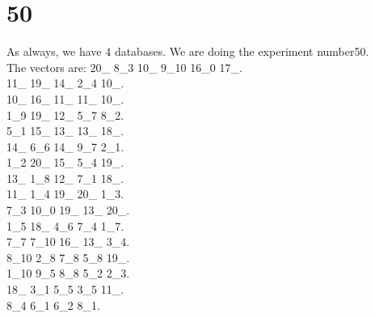 \chapter{50}
\indent As always, we have 4 databases. We are doing the experiment number50.\\
The vectors are:
20\_ 8\_3 10\_ 9\_10 16\_0 17\_.\\11\_ 19\_ 14\_ 2\_4 10\_.\\10\_ 16\_ 11\_ 11\_ 10\_.\\1\_9 19\_ 12\_ 5\_7 8\_2.\\5\_1 15\_ 13\_ 13\_ 18\_.\\14\_ 6\_6 14\_ 9\_7 2\_1.\\1\_2 20\_ 15\_ 5\_4 19\_.\\13\_ 1\_8 12\_ 7\_1 18\_.\\11\_ 1\_4 19\_ 20\_ 1\_3.\\7\_3 10\_0 19\_ 13\_ 20\_.\\1\_5 18\_ 4\_6 7\_4 1\_7.\\7\_7 7\_10 16\_ 13\_ 3\_4.\\8\_10 2\_8 7\_8 5\_8 19\_.\\1\_10 9\_5 8\_8 5\_2 2\_3.\\18\_ 3\_1 5\_5 3\_5 11\_.\\8\_4 6\_1 6\_2 8\_1.\\